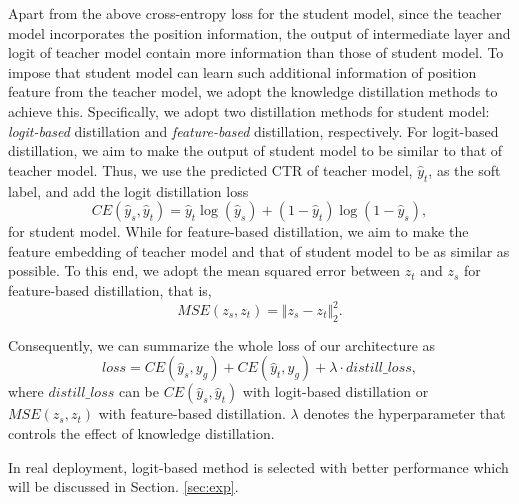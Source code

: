 \documentclass[sigconf,natbib=true,anonymous=false]{acmart}
\begin{document}
Apart from the above cross-entropy loss for the student model, since the teacher model incorporates the position information, the output of intermediate layer and logit of teacher model contain more information than those of student model.
To impose that student model can learn such additional information of position feature from the teacher model, we adopt the knowledge distillation methods to achieve this. Specifically, we adopt two distillation methods for student model: \textit{logit-based} distillation and \textit{feature-based} distillation, respectively.
For logit-based distillation, we aim to make the output of student model to be similar to that of teacher model.
Thus, we use the predicted CTR of teacher model, $\hat{y}_t$, as the soft label, and add the logit distillation loss
\begin{equation}
    CE(\hat{y}_s, \hat{y}_t) = \hat{y}_t \log(\hat{y}_s) + (1 - \hat{y}_t) \log(1 - \hat{y}_s),
\end{equation}
for student model. While for feature-based distillation, we aim to make the feature embedding of teacher model and that of student model to be as similar as possible.
To this end, we adopt the mean squared error between $z_t$ and $z_s$ for feature-based distillation, that is,
\begin{equation}
    MSE(z_s, z_t) = \Vert z_s - z_t \Vert_2^2.
\end{equation}

Consequently, we can summarize the whole loss of our architecture as
\begin{equation}
    loss = CE(\hat{y}_s, y_g) + CE(\hat{y}_t, y_g) + \lambda \cdot distill\_loss,
\end{equation}
where $distill\_loss$ can be $CE(\hat{y}_s, \hat{y}_t)$ with logit-based distillation or $MSE(z_s, z_t)$ with feature-based distillation. $\lambda$ denotes the hyperparameter that controls the effect of knowledge distillation. 


In real deployment, logit-based method is selected with better performance which will be discussed in Section. \ref{sec:exp}.

\end{document}

